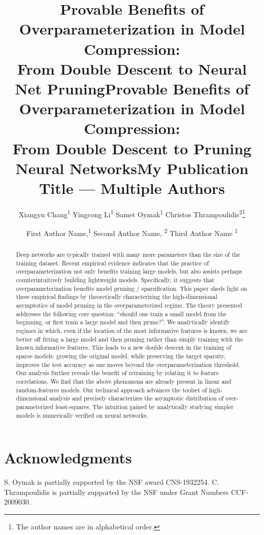 \documentclass[letterpaper]{article} %
\title{Provable Benefits of Overparameterization in Model Compression:\\From Double Descent to Neural Net Pruning}
\title{Provable Benefits of Overparameterization in Model Compression:\\From Double Descent to Pruning Neural Networks}
\author {
            Xiangyu Chang\textsuperscript{\rm 1}\quad
        Yingcong Li\textsuperscript{\rm 1}\quad
        Samet Oymak\textsuperscript{\rm 1} \quad
        Christos Thrampoulidis\textsuperscript{\rm 2}\footnote{The author names are in alphabetical order.}\\ 
}
\title{My Publication Title --- Multiple Authors}
\author {

        First Author Name,\textsuperscript{\rm 1}
        Second Author Name, \textsuperscript{\rm 2}
        Third Author Name \textsuperscript{\rm 1} \\
}
\begin{document}
\maketitle
\begin{abstract}
Deep networks are typically trained with many more parameters than the size of the training dataset. Recent empirical evidence indicates that the practice of overparameterization not only benefits training large models, but also assists  perhaps counterintuitively  building lightweight models. Specifically, it suggests that overparameterization benefits model pruning / sparsification. This paper sheds light on these empirical findings by theoretically characterizing the high-dimensional asymptotics of model pruning in the overparameterized regime. The theory presented addresses the following core question: ``should one train a small model from the beginning, or first train a large model and then prune?''. We analytically identify regimes in which, even if the location of the most informative features is known, we are better off fitting a large model and then pruning rather than simply training with the known informative features. This leads to a new double descent in the training of sparse models: growing the original model, while preserving the target sparsity, improves the test accuracy as one moves beyond the overparameterization threshold. Our analysis further reveals the benefit of retraining by relating it to feature correlations. We find that the above phenomena are already present in linear and random-features models. Our technical approach advances the toolset of high-dimensional analysis and precisely characterizes the asymptotic distribution of over-parameterized least-squares. The intuition gained by analytically studying simpler models is numerically verified on neural networks.
\end{abstract}















\section*{Acknowledgments}
S. Oymak is partially supported by the NSF award CNS-1932254. C. Thrampoulidis is partially supported by the NSF under Grant Numbers CCF-2009030. 
\end{document}
